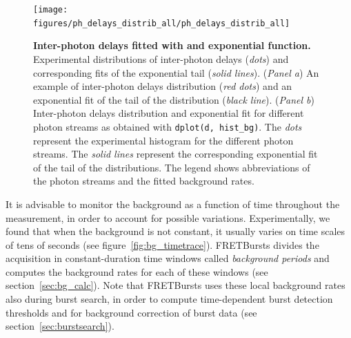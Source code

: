 \documentclass[10pt,letterpaper]{article}
\begin{document}
\begin{figure}[h!]
\begin{center}
\texttt{[image: figures/ph\_delays\_distrib\_all/ph\_delays\_distrib\_all]}
\caption{\label{fig:bg_dist_all} \textbf{Inter-photon delays fitted with and exponential function.} 
Experimental distributions of inter-photon delays (\textit{dots}) and
corresponding fits of the exponential tail (\textit{solid lines}).
(\textit{Panel a}) An example of inter-photon delays distribution (\textit{red dots}) and an exponential fit
of the tail of the distribution (\textit{black line}).
(\textit{Panel b}) Inter-photon delays distribution and exponential fit for different photon streams as obtained with \texttt{dplot(d, hist\_bg)}. The \textit{dots} represent the experimental histogram for the different photon streams. The \textit{solid lines} represent the corresponding exponential fit of the tail of the distributions. The legend shows abbreviations of the photon streams
and the fitted background rates.%
}
\end{center}
\end{figure}

It is advisable to monitor the background as a function of time
throughout the measurement, in order to account for possible variations.
Experimentally, we found that when the background is not constant,
it usually varies
on time scales of tens of seconds (see figure~\ref{fig:bg_timetrace}).
FRETBursts divides the acquisition in constant-duration time
windows called \textit{background periods} and computes the background rates for
each of these windows (see section~\ref{sec:bg_calc}).
Note that FRETBursts uses these local background rates also during burst search, 
in order to compute time-dependent burst detection thresholds 
and for background correction of burst data (see section~\ref{sec:burstsearch}).
\end{document}
